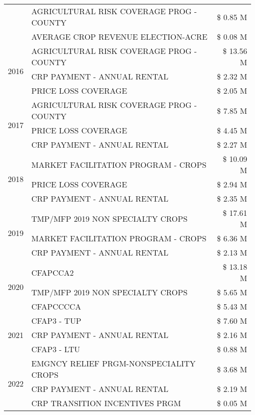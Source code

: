 \begin{tabular}{llr}
 & AGRICULTURAL RISK COVERAGE PROG - COUNTY & \$ 0.85 M \\
 & AVERAGE CROP REVENUE ELECTION-ACRE & \$ 0.08 M \\
\cline{1-3}
\multirow[t]{3}{*}{2016} & AGRICULTURAL RISK COVERAGE PROG - COUNTY & \$ 13.56 M \\
 & CRP PAYMENT - ANNUAL RENTAL & \$ 2.32 M \\
 & PRICE LOSS COVERAGE & \$ 2.05 M \\
\cline{1-3}
\multirow[t]{3}{*}{2017} & AGRICULTURAL RISK COVERAGE PROG - COUNTY & \$ 7.85 M \\
 & PRICE LOSS COVERAGE & \$ 4.45 M \\
 & CRP PAYMENT - ANNUAL RENTAL & \$ 2.27 M \\
\cline{1-3}
\multirow[t]{3}{*}{2018} & MARKET FACILITATION PROGRAM - CROPS & \$ 10.09 M \\
 & PRICE LOSS COVERAGE & \$ 2.94 M \\
 & CRP PAYMENT - ANNUAL RENTAL & \$ 2.35 M \\
\cline{1-3}
\multirow[t]{3}{*}{2019} & TMP/MFP 2019 NON SPECIALTY CROPS & \$ 17.61 M \\
 & MARKET FACILITATION PROGRAM - CROPS & \$ 6.36 M \\
 & CRP PAYMENT - ANNUAL RENTAL & \$ 2.13 M \\
\cline{1-3}
\multirow[t]{3}{*}{2020} & CFAPCCA2 & \$ 13.18 M \\
 & TMP/MFP 2019 NON SPECIALTY CROPS & \$ 5.65 M \\
 & CFAPCCCCA & \$ 5.43 M \\
\cline{1-3}
\multirow[t]{3}{*}{2021} & CFAP3 - TUP & \$ 7.60 M \\
 & CRP PAYMENT - ANNUAL RENTAL & \$ 2.16 M \\
 & CFAP3 - LTU & \$ 0.88 M \\
\cline{1-3}
\multirow[t]{3}{*}{2022} & EMGNCY RELIEF PRGM-NONSPECIALITY CROPS & \$ 3.68 M \\
 & CRP PAYMENT - ANNUAL RENTAL & \$ 2.19 M \\
 & CRP TRANSITION INCENTIVES PRGM & \$ 0.05 M \\
\cline{1-3}
\bottomrule
\end{tabular}
